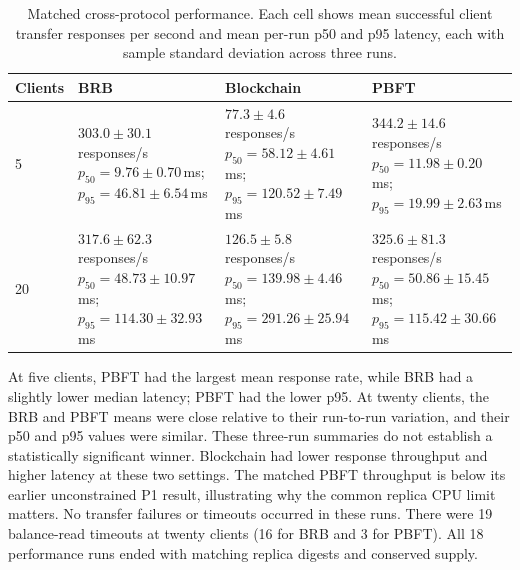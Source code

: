 \documentclass[sigconf,a4paper]{acmart}
\begin{document}
    \begin{table}[t]
        \centering
        \scriptsize
        \caption{Matched cross-protocol performance. Each cell shows mean successful client transfer responses per second and mean per-run p50 and p95 latency, each with sample standard deviation across three runs.}
        \label{tab:cross-protocol-performance}
        \begin{tabular}{p{1.8cm}p{4.9cm}p{4.9cm}p{4.9cm}}
            \toprule
            \textbf{Clients} & \textbf{BRB} & \textbf{Blockchain} & \textbf{PBFT} \\
            \midrule
            5 & \shortstack{$303.0\pm30.1$ responses/s\\$p_{50}=9.76\pm0.70$\,ms; $p_{95}=46.81\pm6.54$\,ms} & \shortstack{$77.3\pm4.6$ responses/s\\$p_{50}=58.12\pm4.61$\,ms; $p_{95}=120.52\pm7.49$\,ms} & \shortstack{$344.2\pm14.6$ responses/s\\$p_{50}=11.98\pm0.20$\,ms; $p_{95}=19.99\pm2.63$\,ms} \\
            20 & \shortstack{$317.6\pm62.3$ responses/s\\$p_{50}=48.73\pm10.97$\,ms; $p_{95}=114.30\pm32.93$\,ms} & \shortstack{$126.5\pm5.8$ responses/s\\$p_{50}=139.98\pm4.46$\,ms; $p_{95}=291.26\pm25.94$\,ms} & \shortstack{$325.6\pm81.3$ responses/s\\$p_{50}=50.86\pm15.45$\,ms; $p_{95}=115.42\pm30.66$\,ms} \\
            \bottomrule
        \end{tabular}
    \end{table}

    At five clients, PBFT had the largest mean response rate, while BRB had a
    slightly lower median latency; PBFT had the lower p95. At twenty clients,
    the BRB and PBFT means were close relative to their run-to-run variation,
    and their p50 and p95 values were similar. These three-run summaries do
    not establish a statistically significant winner. Blockchain had lower
    response throughput and higher latency at these two settings. The matched
    PBFT throughput is below its earlier unconstrained P1 result, illustrating
    why the common replica CPU limit matters. No transfer failures or timeouts
    occurred in these runs. There were 19 balance-read timeouts at twenty
    clients (16 for BRB and 3 for PBFT). All 18 performance runs ended with
    matching replica digests and conserved supply.
\end{document}
